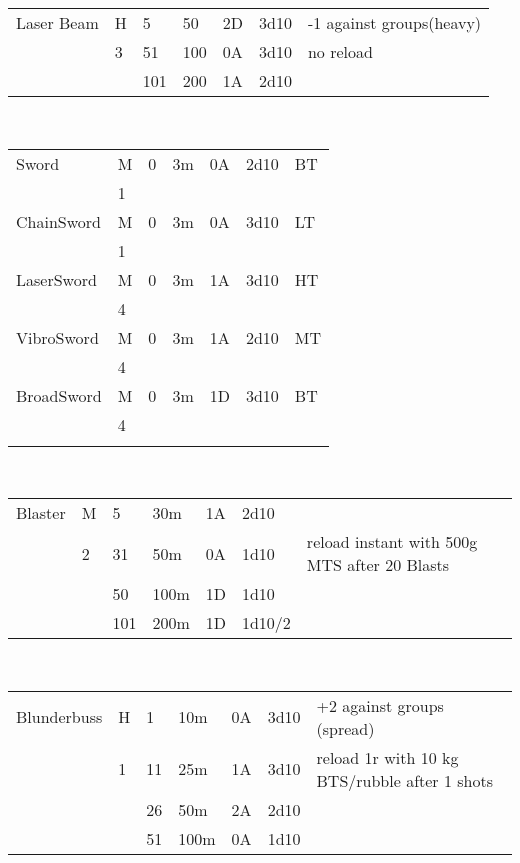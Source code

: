 \documentclass{article}
\begin{document}
 \begin{tabularx}{\textwidth}{p{2cm}p{0.4cm}p{0.5cm}@{ - }p{0.6cm}p{0.6cm}p{0.9cm}p{8cm}}\\\hline
Laser Beam&H   & 5  & 50            & 2D   & 3d10 & -1 against groups(heavy)\\
        &   3    & 51  & 100         & 0A   & 3d10 & no reload\\
        &       & 101 & 200          & 1A   & 2d10\\

\end{tabularx}\\
\begin{tabularx}{\textwidth}{p{2cm}p{0.4cm}p{0.5cm}@{ - }p{0.6cm}p{0.6cm}p{0.9cm}p{8cm}}\\
Sword   & M & 0&3m & 0A & 2d10 & BT\\
&1\\
ChainSword   & M & 0&3m & 0A & 3d10  & LT\\
            &  1\\
LaserSword   & M & 0&3m & 1A & 3d10 &  HT\\
            &4 \\
VibroSword   & M & 0&3m & 1A & 2d10 & MT\\
            &4\\
BroadSword   & M & 0&3m & 1D & 3d10 & BT\\
            &4\\\\            \end{tabularx}\\ 
 \begin{tabularx}{\textwidth}{p{2cm}p{0.4cm}p{0.5cm}@{ - }p{0.6cm}p{0.6cm}p{0.9cm}p{8cm}}\\\hline
Blaster & M     &  5 & 30m          & 1A   & 2d10\\
        &   2    & 31 &  50m         & 0A   & 1d10 & reload instant with 500g MTS after 20 Blasts\\
        &       & 50 & 100m         & 1D   & 1d10\\
        &       & 101 & 200m         & 1D   & 1d10/2\\            \end{tabularx}\\ 
 \begin{tabularx}{\textwidth}{p{2cm}p{0.4cm}p{0.5cm}@{ - }p{0.6cm}p{0.6cm}p{0.9cm}p{8cm}}\\\hline
Blunderbuss & H    &  1 &  10m       & 0A   & 3d10& +2 against groups (spread)\\
        &    1   & 11 &  25m         & 1A   & 3d10 & reload 1r with 10 kg BTS/rubble after 1 shots\\
        &       & 26 & 50m          & 2A   & 2d10\\\
        &       & 51 & 100m         & 0A   & 1d10\\            \end{tabularx}\\ 
\end{document}
